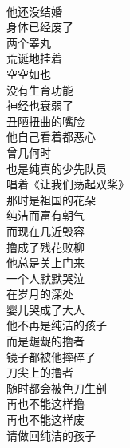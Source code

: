 \begin{poem}[刀尖上的撸者]
    \begin{multicols}{3}
        \centering~\\
        他还没结婚 \\ 身体已经废了 \\ 两个睾丸 \\ 荒诞地挂着 \\ 空空如也 \\ 没有生育功能 \\ 神经也衰弱了 \\ 丑陋扭曲的嘴脸 \\ 他自己看着都恶心 \\ 曾几何时 \\ 也是纯真的少先队员 \\ 唱着《让我们荡起双桨》 \\ 那时是祖国的花朵 \\ 纯洁而富有朝气 \\ 而现在几近毁容 \\ 撸成了残花败柳 \\ 他总是关上门来 \\ 一个人默默哭泣 \\ 在岁月的深处 \\ 婴儿哭成了大人 \\ 他不再是纯洁的孩子 \\ 而是龌龊的撸者 \\ 镜子都被他摔碎了 \\ 刀尖上的撸者 \\ 随时都会被色刀生剖 \\ 再也不能这样撸 \\ 再也不能这样废 \\ 请做回纯洁的孩子
    \end{multicols}
\end{poem}

